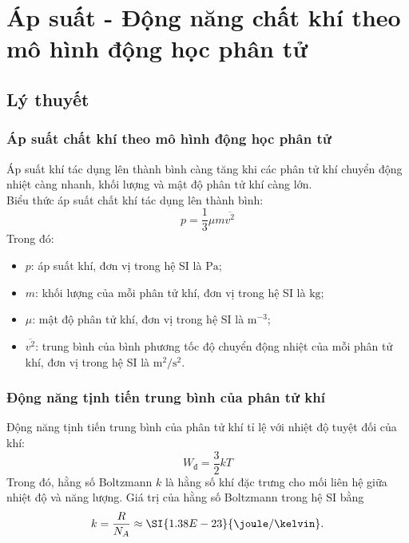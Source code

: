 \let\lesson\undefined
\newcommand{\lesson}{\phantomlesson{Bài 8: Áp suất - Động năng chất khí theo mô hình động học phân tử}}
\chapter[Áp suất - Động năng chất khí theo mô hình động học phân tử]{Áp suất - Động năng chất khí theo mô hình động học phân tử}
\section{Lý thuyết}
\subsection{Áp suất chất khí theo mô hình động học phân tử}
Áp suất khí tác dụng lên thành bình càng tăng khi các phân tử khí chuyển động nhiệt càng nhanh, khối lượng và mật độ phân tử khí càng lớn.\\
Biểu thức áp suất chất khí tác dụng lên thành bình:
\begin{equation}
	p=\dfrac{1}{3}\mu m\overline{v^2}
\end{equation}
Trong đó:
\begin{itemize}
	\item $p$: áp suất khí, đơn vị trong hệ SI là $\si{\pascal}$;
	\item $m$: khối lượng của mỗi phân tử khí, đơn vị trong hệ SI là $\si{\kilogram}$;
	\item $\mu$: mật độ phân tử khí, đơn vị trong hệ SI là $\si{\meter^{-3}}$;
	\item $\overline{v^2}$: trung bình của bình phương tốc độ chuyển động nhiệt của mỗi phân tử khí, đơn vị trong hệ SI là $\si{\meter^2/\second^2}$.
\end{itemize}
\subsection{Động năng tịnh tiến trung bình của phân tử khí}
Động năng tịnh tiến trung bình của phân tử khí tỉ lệ với nhiệt độ tuyệt đối của khí:
\begin{equation}
	W_\text{đ}=\dfrac{3}{2}kT
\end{equation}
Trong đó, hằng số Boltzmann $k$ là hằng số khí đặc trưng cho mối liên hệ giữa nhiệt độ và năng lượng. Giá trị của hằng số Boltzmann trong hệ SI bằng
$$k=\dfrac{R}{N_A}\approx\SI{1.38E-23}{\joule/\kelvin}.$$

